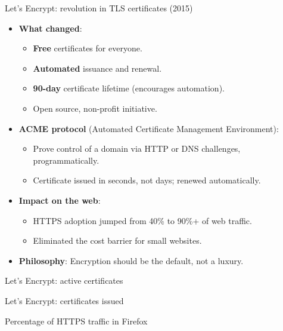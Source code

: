 \ifdefined\PRESENTATION\else\PassOptionsToClass{handout}{beamer}\fi\documentclass[aspectratio=169, lualatex]{beamer}
\begin{document}
\begin{frame}{Let's Encrypt: revolution in TLS certificates (2015)}
	\begin{itemize}[<+->]
		\item \textbf{What changed}:
		      \begin{itemize}
			      \item \textbf{Free} certificates for everyone.
			      \item \textbf{Automated} issuance and renewal.
			      \item \textbf{90-day} certificate lifetime (encourages automation).
			      \item Open source, non-profit initiative.
		      \end{itemize}
		\item \textbf{ACME protocol} (Automated Certificate Management Environment):
		      \begin{itemize}
			      \item Prove control of a domain via HTTP or DNS challenges, programmatically.
			      \item Certificate issued in seconds, not days; renewed automatically.
		      \end{itemize}
		\item \textbf{Impact on the web}:
		      \begin{itemize}
			      \item HTTPS adoption jumped from 40\% to 90\%+ of web traffic.
			      \item Eliminated the cost barrier for small websites.
		      \end{itemize}
		\item \textbf{Philosophy}: Encryption should be the default, not a luxury.
	\end{itemize}
\end{frame}

\begin{frame}{Let's Encrypt: active certificates}
\end{frame}

\begin{frame}{Let's Encrypt: certificates issued}
\end{frame}

\begin{frame}{Percentage of HTTPS traffic in Firefox}
\end{frame}
\end{document}
